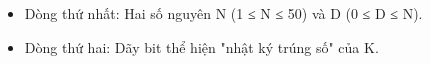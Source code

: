 \begin{itemize}
	\item Dòng thứ nhất: Hai số nguyên N (1 ≤ N ≤ 50) và D (0 ≤ D ≤ N).
	\item Dòng thứ hai: Dãy bit thể hiện "nhật ký trúng số" của K.
\end{itemize}